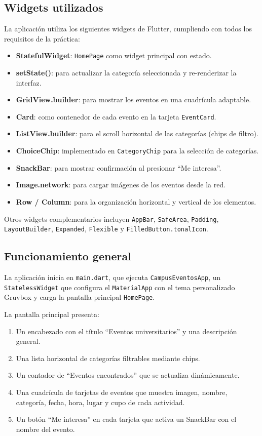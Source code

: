 \documentclass[12pt, a4paper]{article}
\begin{document}
\subsection{Widgets utilizados}

La aplicación utiliza los siguientes widgets de Flutter, cumpliendo con todos los requisitos de la práctica:

\begin{itemize}[noitemsep]
    \item \textbf{StatefulWidget}: \texttt{HomePage} como widget principal con estado.
    \item \textbf{setState()}: para actualizar la categoría seleccionada y re-renderizar la interfaz.
    \item \textbf{GridView.builder}: para mostrar los eventos en una cuadrícula adaptable.
    \item \textbf{Card}: como contenedor de cada evento en la tarjeta \texttt{EventCard}.
    \item \textbf{ListView.builder}: para el scroll horizontal de las categorías (chips de filtro).
    \item \textbf{ChoiceChip}: implementado en \texttt{CategoryChip} para la selección de categorías.
    \item \textbf{SnackBar}: para mostrar confirmación al presionar ``Me interesa''.
    \item \textbf{Image.network}: para cargar imágenes de los eventos desde la red.
    \item \textbf{Row / Column}: para la organización horizontal y vertical de los elementos.
\end{itemize}

Otros widgets complementarios incluyen \texttt{AppBar}, \texttt{SafeArea}, \texttt{Padding}, \texttt{LayoutBuilder}, \texttt{Expanded}, \texttt{Flexible} y \texttt{FilledButton.tonalIcon}.

\subsection{Funcionamiento general}

La aplicación inicia en \texttt{main.dart}, que ejecuta \texttt{CampusEventosApp}, un \texttt{StatelessWidget} que configura el \texttt{MaterialApp} con el tema personalizado Gruvbox y carga la pantalla principal \texttt{HomePage}.

La pantalla principal presenta:
\begin{enumerate}[noitemsep]
    \item Un encabezado con el título ``Eventos universitarios'' y una descripción general.
    \item Una lista horizontal de categorías filtrables mediante chips.
    \item Un contador de ``Eventos encontrados'' que se actualiza dinámicamente.
    \item Una cuadrícula de tarjetas de eventos que muestra imagen, nombre, categoría, fecha, hora, lugar y cupo de cada actividad.
    \item Un botón ``Me interesa'' en cada tarjeta que activa un SnackBar con el nombre del evento.
\end{enumerate}
\end{document}
